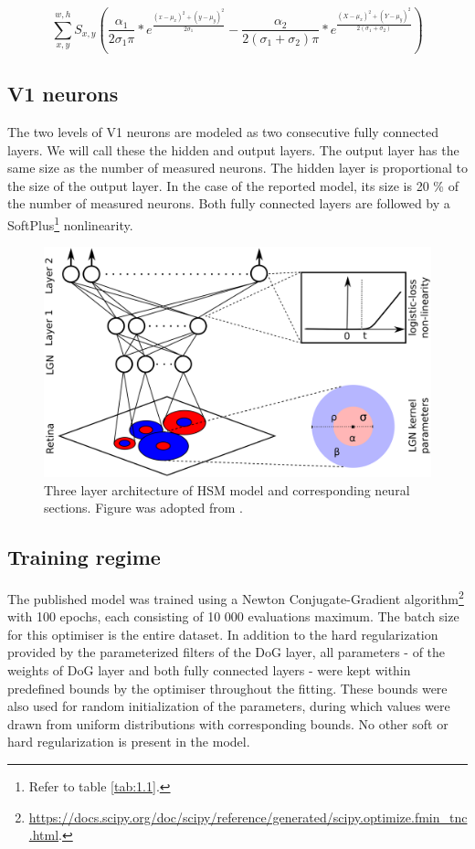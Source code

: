 \begin{equation}\label{eq:2.1}
    \sum_{x,y}^{w,h} S_{x,y}
(
{\frac{\alpha_1}{ 2 \sigma_1 \pi}} * e^{\frac{(x - \mu_x)^2 + (y - \mu_y)^2}{2\sigma_1}} -
{\frac{\alpha_2}{2 (\sigma_1+\sigma_2) \pi}} * e^{\frac{(X - \mu_x)^2 + (Y - \mu_y)^2}{ 2(\sigma_1+\sigma_2) }}
)
\end{equation}

\subsection{V1 neurons}
The two levels of V1 neurons are modeled as two consecutive fully connected layers. We will call these the hidden and output layers. The output layer has the same size as the number of measured neurons. The hidden layer is proportional to the size of the output layer. In the case of the reported model, its size is 20 \% of the number of measured neurons. Both fully connected layers are followed by a SoftPlus\footnote{Refer to table \ref{tab:1.1}.} nonlinearity.

\begin{figure}[h]
    \centering
    \includegraphics[width=1\textwidth]{../figures/02_HSM}
    \caption[HSM model architecture]{Three layer architecture of HSM model and corresponding neural sections. Figure was adopted from \cite{antolik}.}
    \label{fig:2.1}
\end{figure}

\subsection{Training regime}\label{ch:2.1.3}

The published model was trained using a Newton Conjugate-Gradient algorithm\footnote{\href{https://docs.scipy.org/doc/scipy/reference/generated/scipy.optimize.fmin_tnc.html}{https://docs.scipy.org/doc/scipy/reference/generated/scipy.optimize.fmin\_tnc.html}.} with 100 epochs, each consisting of 10 000 evaluations maximum. The batch size for this optimiser is the entire dataset. In addition to the hard regularization provided by the parameterized filters of the DoG layer, all parameters - of the weights of DoG layer and both fully connected layers - were kept within predefined bounds by the optimiser throughout the fitting. These bounds were also used for random initialization of the parameters, during which values were drawn from uniform distributions with corresponding bounds. No other soft or hard regularization is present in the model. 

